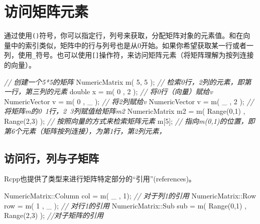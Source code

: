 \documentclass[]{ctexbook}
\newenvironment{Shaded}{\begin{snugshade}}{\end{snugshade}}
\newcommand{\DataTypeTok}[1]{\textcolor[rgb]{0.13,0.29,0.53}{#1}}
\newcommand{\DecValTok}[1]{\textcolor[rgb]{0.00,0.00,0.81}{#1}}
\newcommand{\CommentTok}[1]{\textcolor[rgb]{0.56,0.35,0.01}{\textit{#1}}}
\newcommand{\NormalTok}[1]{#1}
\begin{document}
\section{访问矩阵元素}\label{Accessing-to-Matrix-elements}

通过使用\texttt{()}符号，你可以指定行，列号来获取，分配矩阵对象的元素值。和在向量中的索引类似，矩阵中的行与列号也是从0开始。如果你希望获取某一行或者一列，使用\texttt{\_}符号。也可以使用\texttt{{[}{]}}操作符，来访问矩阵元素（将矩阵理解为按列连接的向量）。

\begin{Shaded}
\begin{Highlighting}[]
\CommentTok{// 创建一个5*5的矩阵}
\NormalTok{NumericMatrix m( }\DecValTok{5}\NormalTok{, }\DecValTok{5}\NormalTok{ );}
\CommentTok{// 检索0行，2列的元素，即第一行，第三列的元素}
\DataTypeTok{double}\NormalTok{ x = m( }\DecValTok{0}\NormalTok{ , }\DecValTok{2}\NormalTok{ );}
\CommentTok{// 将0行（向量）赋给v}
\NormalTok{NumericVector v = m( }\DecValTok{0}\NormalTok{ , _ );}
\CommentTok{// 将2列赋给v}
\NormalTok{NumericVector v = m( _ , }\DecValTok{2}\NormalTok{ );}
\CommentTok{// 将矩阵m的0~1行，2~3列赋值给矩阵m2}
\NormalTok{NumericMatrix m2 = m( Range(}\DecValTok{0}\NormalTok{,}\DecValTok{1}\NormalTok{) , Range(}\DecValTok{2}\NormalTok{,}\DecValTok{3}\NormalTok{) );}
\CommentTok{// 按照向量的方式来检索矩阵元素}
\NormalTok{m[}\DecValTok{5}\NormalTok{]; }\CommentTok{// 指向m(0,1)的位置，即第6个元素（矩阵按列连接），为第1行，第2列元素，}
\end{Highlighting}
\end{Shaded}

\subsection{访问行，列与子矩阵}\label{row-col-sub}

Rcpp也提供了类型来进行矩阵特定部分的``引用''(references)。

\begin{Shaded}
\begin{Highlighting}[]
\NormalTok{NumericMatrix::Column col = m( _ , }\DecValTok{1}\NormalTok{);  }\CommentTok{// 对于列1的引用}
\NormalTok{NumericMatrix::Row    row = m( }\DecValTok{1}\NormalTok{ , _ ); }\CommentTok{// 对行1的引用}
\NormalTok{NumericMatrix::Sub    sub = m( Range(}\DecValTok{0}\NormalTok{,}\DecValTok{1}\NormalTok{) , Range(}\DecValTok{2}\NormalTok{,}\DecValTok{3}\NormalTok{) ); }\CommentTok{//对子矩阵的引用}
\end{Highlighting}
\end{Shaded}
\end{document}

